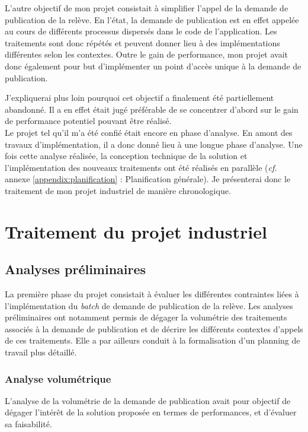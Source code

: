 \documentclass[a4paper, 12pt]{report}
\begin{document}
L'autre objectif de mon projet consistait à simplifier l'appel de la demande de publication de la relève. En l'état, la demande de publication est en effet appelée au cours de différents processus dispersés dans le code de l'application. Les traitements sont donc répétés et peuvent donner lieu à des implémentations différentes selon les contextes. Outre le gain de performance, mon projet avait donc également pour but d'implémenter un point d'accès unique à la demande de publication.

J'expliquerai plus loin pourquoi cet objectif a finalement été partiellement abandonné. Il a en effet était jugé préférable de se concentrer d'abord sur le gain de performance potentiel pouvant être réalisé.\\

Le projet tel qu'il m'a été confié était encore en phase d'analyse. En amont des travaux d'implémentation, il a donc donné lieu à une longue phase d'analyse. Une fois cette analyse réalisée, la conception technique de la solution et l'implémentation des nouveaux traitements ont été réalisés en parallèle (\textit{cf.} annexe \ref{appendix:planification} : Planification générale). Je présenterai donc le traitement de mon projet industriel de manière chronologique.

\chapter{Traitement du projet industriel}

\section{Analyses préliminaires}

La première phase du projet consistait à évaluer les différentes contraintes liées à l'implémentation du \textit{batch} de demande de publication de la relève. Les analyses préliminaires ont notamment permis de dégager la volumétrie des traitements associés à la demande de publication et de décrire les différents contextes d'appels de ces traitements. Elle a par ailleurs conduit à la formalisation d'un planning de travail plus détaillé.

\subsection{Analyse volumétrique}

L'analyse de la volumétrie de la demande de publication avait pour objectif de dégager l'intérêt de la solution proposée en termes de performances, et d'évaluer sa faisabilité.\\
\end{document}
